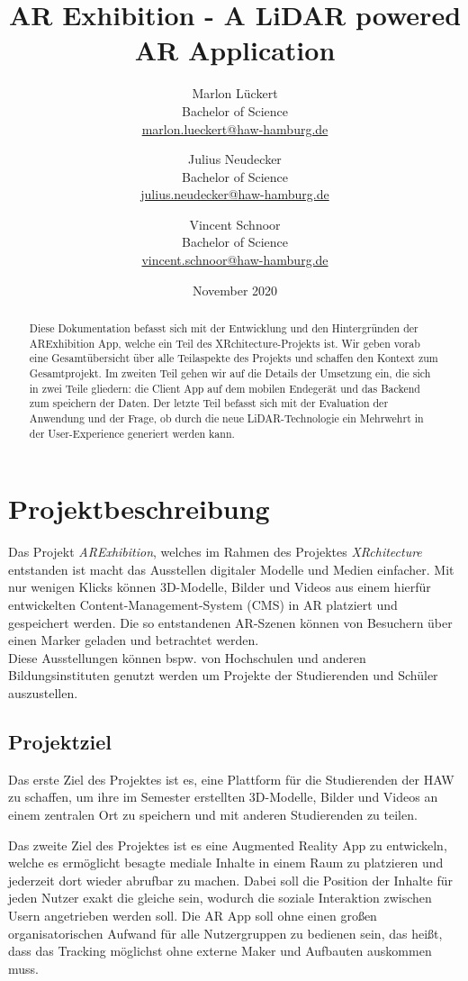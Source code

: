 \documentclass[titlepage, a4paper, 11pt]{scrartcl}
\title{AR Exhibition - A LiDAR powered AR Application}
\author{Marlon Lückert \\ Bachelor of Science \\ \href{mailto:marlon.lueckert@haw-hamburg.de}{marlon.lueckert@haw-hamburg.de} 
\and Julius Neudecker \\ Bachelor of Science \\ \href{mailto:julius.neudecker@haw-hamburg.de}{julius.neudecker@haw-hamburg.de}
\and Vincent Schnoor \\ Bachelor of Science \\ \href{mailto:vincent.schnoor@haw-hamburg.de}{vincent.schnoor@haw-hamburg.de} }
\date{November 2020}
\begin{document}
  \maketitle

  \tableofcontents

  \begin{abstract}
    Diese Dokumentation befasst sich mit der Entwicklung und den Hintergründen der ARExhibition App, welche ein Teil des XRchitecture-Projekts ist.
    Wir geben vorab eine Gesamtübersicht über alle Teilaspekte des Projekts und schaffen den Kontext zum Gesamtprojekt.
    Im zweiten Teil gehen wir auf die Details der Umsetzung ein, die sich in zwei Teile gliedern: die Client App auf dem mobilen Endegerät und das Backend zum speichern der Daten.
    Der letzte Teil befasst sich mit der Evaluation der Anwendung und der Frage, ob durch die neue LiDAR-Technologie ein Mehrwehrt in der User-Experience generiert werden kann.
  \end{abstract}

  \section{Projektbeschreibung}
    Das Projekt \textit{ARExhibition}, welches im Rahmen des Projektes \textit{XRchitecture} entstanden ist macht das Ausstellen digitaler Modelle und Medien einfacher. 
    Mit nur wenigen Klicks können 3D-Modelle, Bilder und Videos aus einem hierfür entwickelten Content-Management-System (CMS) in AR platziert und gespeichert werden. 
    Die so entstandenen AR-Szenen können von Besuchern über einen Marker geladen und betrachtet werden.\\
    Diese Ausstellungen können bspw. von Hochschulen und anderen Bildungsinstituten genutzt werden um Projekte der Studierenden und Schüler auszustellen.

    \subsection{Projektziel}
      Das erste Ziel des Projektes ist es, eine Plattform für die Studierenden der HAW zu schaffen, um ihre im Semester erstellten 3D-Modelle, 
      Bilder und Videos an einem zentralen Ort zu speichern und mit anderen Studierenden zu teilen.

      Das zweite Ziel des Projektes ist es eine Augmented Reality App zu entwickeln, welche es ermöglicht besagte mediale Inhalte in einem Raum zu platzieren und jederzeit dort wieder abrufbar zu machen.
      Dabei soll die Position der Inhalte für jeden Nutzer exakt die gleiche sein, wodurch die soziale Interaktion zwischen Usern angetrieben werden soll.
      Die AR App soll ohne einen großen organisatorischen Aufwand für alle Nutzergruppen zu bedienen sein, das heißt, dass das Tracking möglichst ohne externe Maker und Aufbauten auskommen muss.
\end{document}
